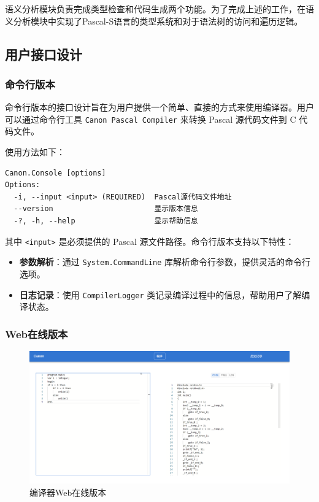 \documentclass[../main.tex]{subfiles}
\begin{document}
语义分析模块负责完成类型检查和代码生成两个功能。为了完成上述的工作，在语义分析模块中实现了Pascal-S语言的类型系统和对于语法树的访问和遍历逻辑。

\subsection{用户接口设计}

\subsubsection{命令行版本}

命令行版本的接口设计旨在为用户提供一个简单、直接的方式来使用编译器。用户可以通过命令行工具 \texttt{Canon Pascal Compiler} 来转换 Pascal 源代码文件到 C 代码文件。

使用方法如下：

\begin{verbatim}
Canon.Console [options]
Options:
  -i, --input <input> (REQUIRED)  Pascal源代码文件地址
  --version                       显示版本信息
  -?, -h, --help                  显示帮助信息
\end{verbatim}

其中 \texttt{<input>} 是必须提供的 Pascal 源文件路径。命令行版本支持以下特性：

\begin{itemize}
    \item \textbf{参数解析}：通过 \texttt{System.CommandLine} 库解析命令行参数，提供灵活的命令行选项。
    \item \textbf{日志记录}：使用 \texttt{CompilerLogger} 类记录编译过程中的信息，帮助用户了解编译状态。
\end{itemize}

\subsubsection{Web在线版本}
\begin{figure}[h]
    \centering
    \includegraphics[width=0.9\linewidth]{assets/编译器Web在线版本.png}
    \caption{编译器Web在线版本}
    \label{fig:compiler_web_fig}
\end{figure}
\end{document}
